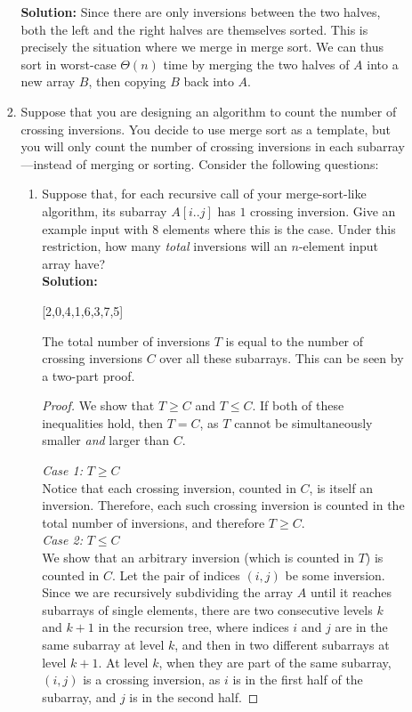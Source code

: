 \documentclass[letterpaper,11pt]{article}
\begin{document}
\begin{enumerate}
\begin{enumerate}
\begin{enumerate}
\textbf{Solution:} Since there are only inversions between the two halves, both the left and the right halves are themselves sorted. This is precisely the situation where we merge in merge sort. We can thus sort in worst-case $\Theta(n)$ time by merging the two halves of $A$ into a new array $B$, then copying $B$ back into $A$. \\

\item Suppose that you are designing an algorithm to count the number of crossing inversions. You decide to use merge sort as a template, but you will only count the number of crossing inversions in each subarray---instead of merging or sorting. Consider the following questions:
\begin{enumerate}
\item Suppose that, for each recursive call of your merge-sort-like algorithm, its subarray $A[i..j]$ has $1$ crossing inversion. Give an example input with $8$ elements where this is the case. Under this restriction, how many \emph{total} inversions will an $n$-element input array have?\\

\textbf{Solution:}
\begin{center}
[2,0,4,1,6,3,7,5]
\end{center}

The total number of inversions $T$ is equal to the number of crossing inversions $C$ over all these subarrays. This can be seen by a two-part proof.
\begin{proof} 
We show that $T\geq C$ and $T\leq C$. If both of these inequalities hold, then $T=C$, as $T$ cannot be simultaneously smaller \emph{and} larger than $C$.

\emph{Case 1:} $T\geq C$\\

Notice that each crossing inversion, counted in $C$, is itself an inversion. Therefore, each such crossing inversion is counted in the total number of inversions, and therefore $T\geq C$.\\

\emph{Case 2:} $T\leq C$\\

We show that an arbitrary inversion (which is counted in $T$) is counted in $C$. Let the pair of indices $(i,j)$ be some inversion. Since we are recursively subdividing the array $A$ until it reaches subarrays of single elements, there are two consecutive levels $k$ and $k+1$ in the recursion tree, where indices $i$ and $j$ are in the same subarray at level $k$, and then in two different subarrays at level $k+1$. At level $k$, when they are part of the same subarray, $(i,j)$ is a crossing inversion, as $i$ is in the first half of the subarray, and $j$ is in the second half.
\end{proof}


\end{enumerate}
\end{enumerate}
\end{enumerate}
\end{enumerate}
\end{document}

